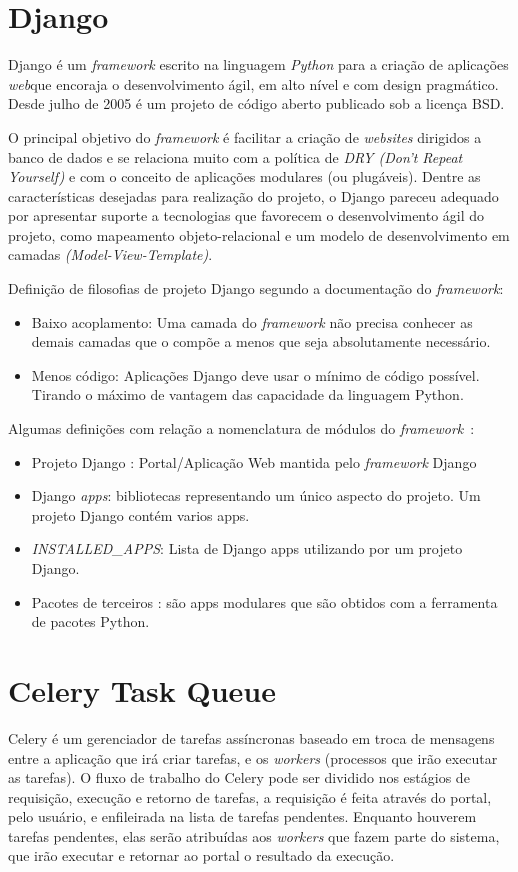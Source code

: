 \documentclass[tg]{mdtufsm}
\begin{document}
\section{Django}
Django é um \emph{framework} escrito na linguagem \emph{Python} para a criação de aplicações \emph{web}que encoraja o desenvolvimento ágil, em alto nível e com design pragmático. Desde julho de 2005 é um projeto de código aberto publicado sob a licença BSD.

O principal objetivo do \emph{framework} é facilitar a criação de \emph{websites} dirigidos a banco de dados e se relaciona muito com a política de \emph{DRY (Don't Repeat Yourself)} e com o conceito de aplicações modulares (ou plugáveis). Dentre as características desejadas para realização do projeto, o Django pareceu adequado por apresentar suporte a tecnologias que favorecem o desenvolvimento ágil do projeto, como mapeamento objeto-relacional e um modelo de desenvolvimento em camadas \emph{(Model-View-Template)}.

Definição de filosofias de projeto Django segundo a documentação do \emph{framework}:
\begin{itemize}
	\item Baixo acoplamento: Uma camada do \emph{framework} não precisa conhecer as demais camadas que o compõe a menos que seja absolutamente necessário. 
	\item Menos código: Aplicações Django deve usar o mínimo de código possível. Tirando o máximo de vantagem das capacidade da linguagem Python.
\end{itemize}

Algumas definições com relação a nomenclatura de módulos do \emph{framework}~\cite{twoscoopes}:
\begin{itemize}
	\item  Projeto Django : Portal/Aplicação Web mantida pelo \emph{framework} Django
	\item  Django\emph{ apps}: bibliotecas representando um único aspecto do projeto. Um projeto Django contém varios apps.
	\item \emph{INSTALLED\_APPS}: Lista de Django apps utilizando por um projeto Django.
	\item Pacotes de terceiros : são apps modulares que são obtidos com a ferramenta de pacotes Python.
\end{itemize}

\section{Celery Task Queue}
Celery é um gerenciador de tarefas assíncronas baseado em troca de mensagens entre a aplicação que irá criar tarefas, e os \emph{workers} (processos que irão executar as tarefas). O fluxo de trabalho do Celery pode ser dividido nos estágios de requisição, execução e retorno de tarefas, a requisição é feita através do portal, pelo usuário, e enfileirada na lista de tarefas pendentes. Enquanto houverem tarefas pendentes, elas serão atribuídas aos \emph{workers} que fazem parte do sistema, que irão executar e retornar ao portal o resultado da execução.
\end{document}

